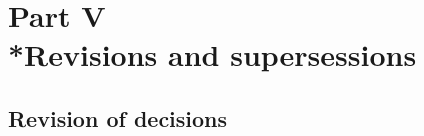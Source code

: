 \documentclass[a4paper,12pt]{article}
\begin{document}
%
%

\section[Part V --- Revisions and supersessions]{Part V\\*Revisions and supersessions}

\renewcommand\parthead{--- Part V}


\subsection[17. Revision of decisions]{Revision of decisions}
\end{document}
